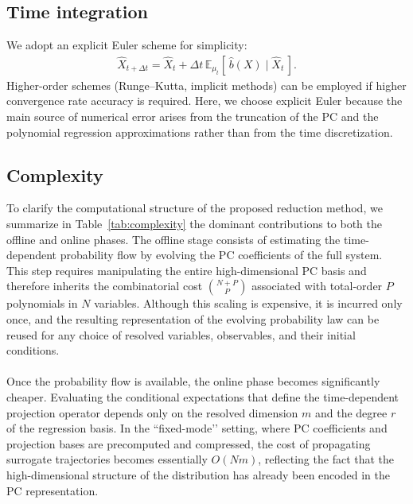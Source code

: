 \documentclass[11pt, a4paper, oneside, reqno]{amsart}
\begin{document}
\subsection{Time integration}
\noindent We adopt an explicit Euler scheme for simplicity:
\begin{eqnarray}\label{eq:Reduced Dynamics Discretized}
\hat{X}_{t+\Delta t} = \hat{X}_t + \Delta t \, \mathbb{E}_{\mu_t}[\,\hat{b}(X)\mid \hat{X}_t\,].
\end{eqnarray}
Higher-order schemes (Runge–Kutta, implicit methods) can be employed if higher convergence rate accuracy is required. Here, we choose explicit Euler because the main source of numerical error arises from the truncation of the PC and the polynomial regression approximations rather than from the time discretization.  

\subsection{Complexity}
\noindent To clarify the computational structure of the proposed reduction method, we summarize in 
Table~\ref{tab:complexity} the dominant contributions to both the offline and online phases.  
The offline stage consists of estimating the time-dependent probability flow by evolving the 
PC coefficients of the full system. This step requires manipulating the 
entire high-dimensional PC basis and therefore inherits the combinatorial cost 
$\binom{N+P}{P}$ associated with total-order $P$ polynomials in $N$ variables. 
Although this scaling is expensive, it is incurred only once, and the resulting representation 
of the evolving probability law can be reused for any choice of resolved variables, observables, 
 and their initial conditions. \\ \ \\
Once the probability flow is available, the online phase becomes significantly cheaper. 
Evaluating the conditional expectations that define the time-dependent projection operator 
depends only on the resolved dimension $m$ and the degree $r$ of the regression basis.  
In the “fixed-mode’’ setting, where PC coefficients and projection bases are precomputed and 
compressed, the cost of propagating surrogate trajectories becomes essentially 
$O(N m)$, reflecting the fact that the high-dimensional structure of the distribution has 
already been encoded in the PC representation.  
\end{document}
